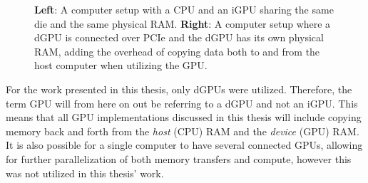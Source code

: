 \begin{figure}[H]\label{figure:igpu-and-dgpu-system}
\begin{center}
\hspace{7em}
\caption{\textbf{Left}: A computer setup with a CPU and an iGPU sharing the same die and the same physical RAM. \textbf{Right}: A computer setup where a dGPU is connected over PCIe and the dGPU has its own physical RAM, adding the overhead of copying data both to and from the host computer when utilizing the GPU.}
\end{center}
\end{figure}

For the work presented in this thesis, only dGPUs were utilized. 
Therefore, the term GPU will from here on out be referring to a dGPU and not an iGPU.
This means that all GPU implementations discussed in this thesis will include copying memory back and forth from the \textit{host} (CPU) RAM and the \textit{device} (GPU) RAM.
It is also possible for a single computer to have several connected GPUs, allowing for further parallelization of both memory transfers and compute, however this was not utilized in this thesis' work.
